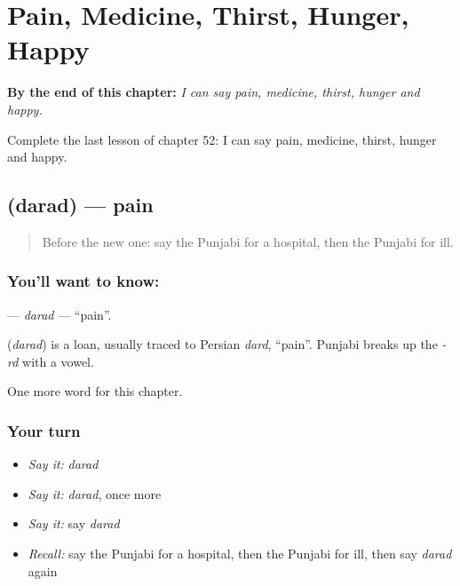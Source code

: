 
\chapter{Pain, Medicine, Thirst, Hunger, Happy}
\label{ch:pa-pain-medicine-thirst-hunger-happy}

\begin{chapteropening}
\textbf{By the end of this chapter:} \emph{I can say pain, medicine, thirst, hunger and happy.}

Complete the last lesson of chapter 52: I can say pain, medicine, thirst, hunger and happy.
\end{chapteropening}

\section[\texorpdfstring{\pa{ਦਰਦ} (darad)}{ਦਰਦ (darad)}]{ (darad) — pain}

\label{lesson:PA-C52-darad}



\begin{quote}
Before the new one: say the Punjabi for a hospital, then the Punjabi for ill.
\end{quote}

\subsection*{You'll want to know: }
\textbf{} — \emph{darad} — \textquotedblleft{}pain\textquotedblright{}.

\begin{cousinweb}
\textbf{} (\emph{darad}) is a loan, usually traced to Persian \emph{dard}, \textquotedblleft{}pain\textquotedblright{}. Punjabi breaks up the \emph{-rd} with a vowel.
\end{cousinweb}

\begin{grammarlens}[title={What you've built}]
One more word for this chapter.
\end{grammarlens}

\subsection*{Your turn}
\begin{itemize}
\raggedright
  \item \emph{Say it:} \emph{darad}
  \item \emph{Say it:} \emph{darad}, once more
  \item \emph{Say it:} say \emph{darad}
  \item \emph{Recall:} say the Punjabi for a hospital, then the Punjabi for ill, then say \emph{darad} again
\end{itemize}

